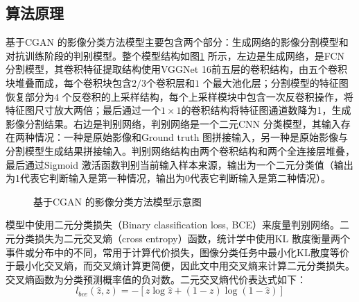 \subsection{算法原理}
\label{subsec:firtst-1}
基于CGAN 的影像分类方法模型主要包含两个部分：生成网络的影像分割模型和对抗训练阶段的判别模型。整个模型结构如图\ref{fig:gan-fcn} 所示，左边是生成网络，是FCN 分割模型，其卷积特征提取结构使用VGGNet 16\cite{simonyan2014very}前五层的卷积结构，由五个卷积块堆叠而成，每个卷积块包含$2/3$个卷积层和$1$ 个最大池化层；分割模型的特征图恢复部分为$4$ 个反卷积的上采样结构，每个上采样模块中包含一次反卷积操作，将特征图尺寸放大两倍；最后通过一个$1\times 1$的卷积结构将特征图通道数降为1，生成影像分割结果。右边是判别网络，判别网络是一个二元CNN 分类模型，其输入存在两种情况：一种是原始影像和Ground truth 图拼接输入，另一种是原始影像与分割模型生成结果拼接输入。判别网络结构由两个卷积结构和两个全连接层堆叠，最后通过Sigmoid 激活函数判别当前输入样本来源，输出为一个二元分类值（输出为1代表它判断输入是第一种情况，输出为0代表它判断输入是第二种情况）。

\begin{figure}[htb]
  \centering
  \begin{center}
    \caption{基于CGAN 的影像分类方法模型示意图}\label{fig:gan-fcn}
  \end{center}
\end{figure}

模型中使用二元分类损失（Binary classification loss, BCE）来度量判别网络。二元分类损失为二元交叉熵（cross entropy）函数，统计学中使用KL 散度衡量两个事件或分布中的不同，常用于计算代价损失，图像分类任务中最小化KL散度等价于最小化交叉熵，而交叉熵计算更简便\cite{de2005tutorial}，因此文中用交叉熵来计算二元分类损失。交叉熵函数为分类预测概率值的负对数。二元交叉熵代价表达式如下：
\begin{equation}
  \label{eq:4-4}
  l_{bce} (\hat{z}, z) = -[z\log\hat{z} + (1-z)\log(1-\hat{z})]
\end{equation}


